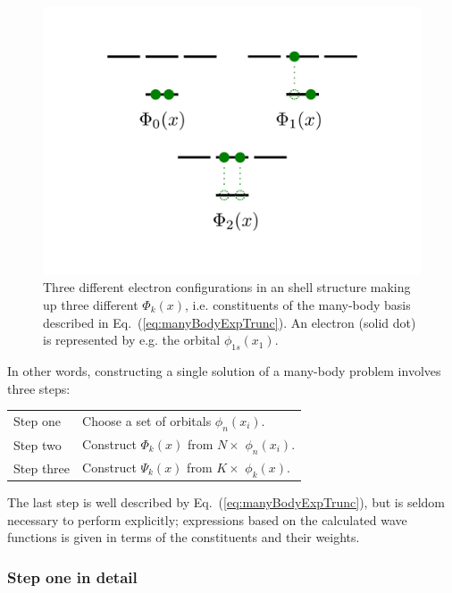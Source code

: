 \begin{figure}
 \begin{center}
  \includegraphics[scale=0.5]{../Graphics/shellStructure.pdf}
  \caption{Three different electron configurations in an shell structure making up three different $\Phi_k(x)$, i.e. constituents of the many-body basis described in Eq.~(\ref{eq:manyBodyExpTrunc}). An electron (solid dot) is represented by e.g. the orbital $\phi_{1s}(x_1)$.}
  \label{fig:AtomicOrbitals}
 \end{center}
\end{figure}

In other words, constructing a single solution of a many-body problem involves three steps:

\begin{center}
\begin{tabular}{l|l}
 Step one   &  Choose a set of orbitals $\phi_n(x_i)$. \\
 Step two   &  Construct $\Phi_k(x)$ from $N\times$ $\phi_n(x_i)$.   \\
 Step three &  Construct $\Psi_k(x)$ from $K\times$ $\phi_k(x)$.     \\
\end{tabular}
\end{center}

The last step is well described by Eq.~(\ref{eq:manyBodyExpTrunc}), but is seldom necessary to perform explicitly; expressions based on the calculated wave functions is given in terms of the constituents and their weights.

\subsubsection{Step one in detail}

